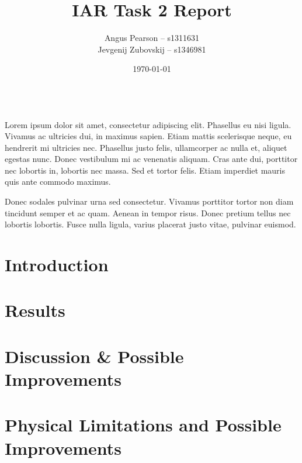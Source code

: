 \documentclass[11pt, a4paper]{article}
\renewenvironment{abstract}{%
{\mdseries\scshape\Large\abstractname}
\vspace{1em}\\
}{\par\noindent}
\begin{document}
\title{IAR Task 2 Report}
\author{Angus Pearson -- s1311631\\ Jevgenij Zubovskij -- s1346981}
\date{\today}
\maketitle



\begin{abstract}
  Lorem ipsum dolor sit amet, consectetur adipiscing elit. Phasellus eu nisi ligula.
  Vivamus ac ultricies dui, in maximus sapien. Etiam mattis scelerisque neque, eu
  hendrerit mi ultricies nec. Phasellus justo felis, ullamcorper ac nulla et,
  aliquet egestas nunc. Donec vestibulum mi ac venenatis aliquam. Cras ante dui,
  porttitor nec lobortis in, lobortis nec massa. Sed et tortor felis. Etiam
  imperdiet mauris quis ante commodo maximus.

  Donec sodales pulvinar urna sed consectetur. Vivamus porttitor tortor non diam
  tincidunt semper et ac quam. Aenean in tempor risus. Donec pretium tellus nec
  lobortis lobortis. Fusce nulla ligula, varius placerat justo vitae, pulvinar euismod.
\end{abstract}



\section{Introduction}



\newpage
\section{Results}


\section{Discussion \& Possible Improvements}


\section{Physical Limitations and Possible Improvements}


\end{document}
